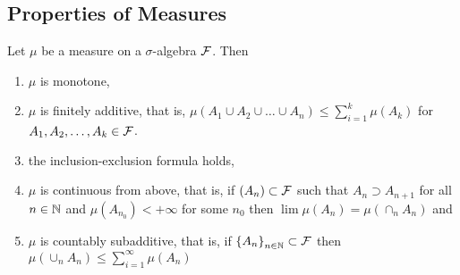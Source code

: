 \subsection{Properties of Measures}

\begin{theorem}
    Let $\mu$ be a measure on a $\sigma$-algebra ${\cal F}$. Then
    \begin{enumerate}[label=(\arabic*)]
	\item $\mu$ is monotone,
	\item $\mu$ is finitely additive, that is, $\mu \left( A_1 \cup A_2 \cup \ldots \cup A_n \right) \le \sum_{i=1}^{k} \mu (A_k)$ for $A_1, A_2, \ldots , A_k \in {\cal F}	$.
	\item the inclusion-exclusion formula holds,
	\item $\mu$ is continuous from above, that is, if $\left( A_n \right) \subset{\cal F}$ such that $A_n \supset A_{n+1}$ for all $n\in\mathbb N$ and $\mu (A_{n_0}) < +\infty$ for some $n_0$ then $\lim \mu(A_n) = \mu \left( \cap_n A_n \right)$ and

	\item $\mu$ is countably subadditive, that is, if $\left\{ A_n \right\}_{n\in \mathbb N}\subset {\cal F}$ then $\mu \left(\cup_n A_n \right) \le \sum_{i=1}^{\infty} \mu \left( A_n \right)$
    \end{enumerate}
    \label{thm:prop-measures}
\end{theorem}
